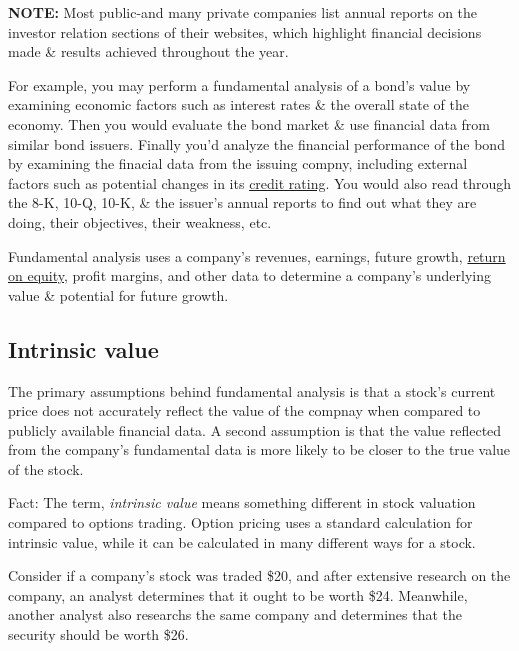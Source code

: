 \documentclass{article}
\begin{document}
	{\bf NOTE:} Most public-and many private companies list annual reports on the investor relation sections of their websites, which highlight financial decisions made \& results achieved 
	throughout the year. \newline

	For example, you may perform a fundamental analysis of a bond's value by examining economic factors such as interest rates \& the overall state of the economy.
	Then you would evaluate the bond market \& use financial data from similar bond issuers. Finally you'd analyze the financial performance of the bond by examining the finacial data from the issuing
	compny, including external factors such as potential changes in its \href{https://www.investopedia.com/terms/c/creditrating.asp}{credit rating}. You would also read through the 8-K, 10-Q, 10-K,
	\& the issuer's annual reports to find out what they are doing, their objectives, their weakness, etc. \newline

	Fundamental analysis uses a company's revenues, earnings, future growth, \href{https://www.investopedia.com/terms/r/returnonequity.asp}{return on equity}, profit margins, and other data to
	determine a company's underlying value \& potential for future growth.

	\subsection{Intrinsic value}

	The primary assumptions behind fundamental analysis is that a stock's current price does not accurately reflect the value of the compnay when compared to publicly available financial data. A
	second assumption is that the value reflected from the company's fundamental data is more likely to be closer to the true value of the stock. \newline

	Fact: The term, \textit{intrinsic value} means something different in stock valuation compared to options trading. Option pricing uses a standard calculation for intrinsic value, while it can
	be calculated in many different ways for a stock. \newline

	Consider if a company's stock was traded \@ \$20, and after extensive research on the company, an analyst determines that it ought to be worth \$24. Meanwhile, another analyst also researchs the same
	company and determines that the security should be worth \$26. \newline
\end{document}
